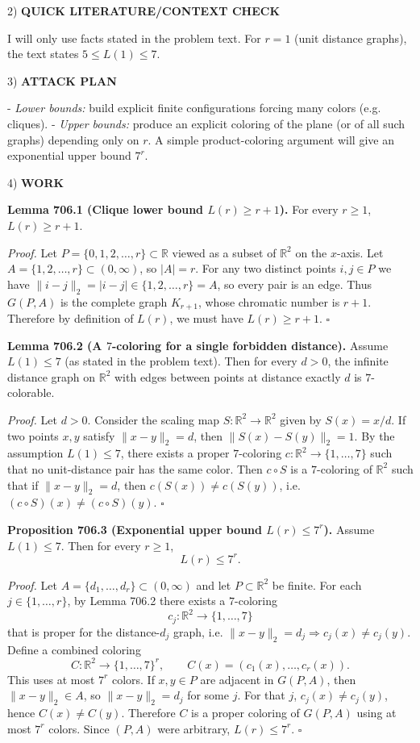 2) \textbf{QUICK LITERATURE/CONTEXT CHECK}

I will only use facts stated in the problem text.
For $r=1$ (unit distance graphs), the text states $5\le L(1)\le 7$.

3) \textbf{ATTACK PLAN}

- \emph{Lower bounds:} build explicit finite configurations forcing many colors (e.g. cliques).
- \emph{Upper bounds:} produce an explicit coloring of the plane (or of all such graphs) depending only on $r$.
A simple product-coloring argument will give an exponential upper bound $7^r$.

4) \textbf{WORK}

\textbf{Lemma 706.1 (Clique lower bound $L(r)\ge r+1$).}
For every $r\ge 1$, $L(r)\ge r+1$.

\textit{Proof.}
Let $P=\{0,1,2,\dots,r\}\subset\mathbb{R}$ viewed as a subset of $\mathbb{R}^2$ on the $x$-axis.
Let $A=\{1,2,\dots,r\}\subset(0,\infty)$, so $|A|=r$.
For any two distinct points $i,j\in P$ we have $\|i-j\|_2=|i-j|\in\{1,2,\dots,r\}=A$, so every pair is an edge.
Thus $G(P,A)$ is the complete graph $K_{r+1}$, whose chromatic number is $r+1$.
Therefore by definition of $L(r)$, we must have $L(r)\ge r+1$.
\hfill$\square$

\textbf{Lemma 706.2 (A $7$-coloring for a single forbidden distance).}
Assume $L(1)\le 7$ (as stated in the problem text). Then for every $d>0$, the infinite distance graph on $\mathbb{R}^2$ with edges between points at distance exactly $d$ is $7$-colorable.

\textit{Proof.}
Let $d>0$.
Consider the scaling map $S:\mathbb{R}^2\to\mathbb{R}^2$ given by $S(x)=x/d$.
If two points $x,y$ satisfy $\|x-y\|_2=d$, then $\|S(x)-S(y)\|_2=1$.
By the assumption $L(1)\le 7$, there exists a proper $7$-coloring $c:\mathbb{R}^2\to\{1,\dots,7\}$ such that no unit-distance pair has the same color.
Then $c\circ S$ is a $7$-coloring of $\mathbb{R}^2$ such that if $\|x-y\|_2=d$, then $c(S(x))\ne c(S(y))$, i.e. $(c\circ S)(x)\ne (c\circ S)(y)$.
\hfill$\square$

\textbf{Proposition 706.3 (Exponential upper bound $L(r)\le 7^r$).}
Assume $L(1)\le 7$.
Then for every $r\ge 1$,
\[
L(r)\le 7^r.
\]

\textit{Proof.}
Let $A=\{d_1,\dots,d_r\}\subset(0,\infty)$ and let $P\subset\mathbb{R}^2$ be finite.
For each $j\in\{1,\dots,r\}$, by Lemma 706.2 there exists a $7$-coloring
\[
 c_j:\mathbb{R}^2\to\{1,\dots,7\}
\]
that is proper for the distance-$d_j$ graph, i.e. $\|x-y\|_2=d_j\Rightarrow c_j(x)\ne c_j(y)$.
Define a combined coloring
\[
 C:\mathbb{R}^2\to\{1,\dots,7\}^r,\qquad C(x)=(c_1(x),\dots,c_r(x)).
\]
This uses at most $7^r$ colors.
If $x,y\in P$ are adjacent in $G(P,A)$, then $\|x-y\|_2\in A$, so $\|x-y\|_2=d_j$ for some $j$.
For that $j$, $c_j(x)\ne c_j(y)$, hence $C(x)\ne C(y)$.
Therefore $C$ is a proper coloring of $G(P,A)$ using at most $7^r$ colors.
Since $(P,A)$ were arbitrary, $L(r)\le 7^r$.
\hfill$\square$

